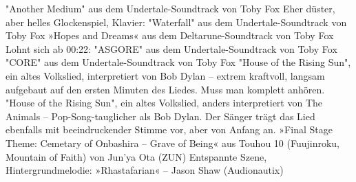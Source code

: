     "Another Medium" aus dem Undertale-Soundtrack von Toby Fox
    Eher düster, aber helles Glockenspiel, Klavier: "Waterfall" aus dem Undertale-Soundtrack von Toby Fox
    »Hopes and Dreams« aus dem Deltarune-Soundtrack von Toby Fox
    Lohnt sich ab 00:22: "ASGORE" aus dem Undertale-Soundtrack von Toby Fox
    "CORE" aus dem Undertale-Soundtrack von Toby Fox
    "House of the Rising Sun", ein altes Volkslied, interpretiert von Bob Dylan -- extrem kraftvoll, langsam aufgebaut auf den ersten Minuten des Liedes. Muss man komplett anhören.
    "House of the Rising Sun", ein altes Volkslied, anders interpretiert von The Animals -- Pop-Song-tauglicher als Bob Dylan. Der Sänger trägt das Lied ebenfalls mit beeindruckender Stimme vor, aber von Anfang an.
    »Final Stage Theme: Cemetary of Onbashira -- Grave of Being« aus Touhou 10 (Fuujinroku, Mountain of Faith) von Jun'ya Ota (ZUN)
    Entspannte Szene, Hintergrundmelodie: »Rhastafarian« – Jason Shaw (Audionautix)

